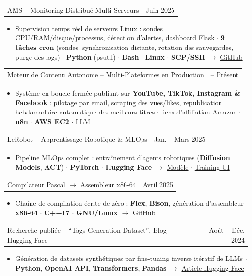 \documentclass[10pt, a4paper]{article}
\makeatletter
\newcommand{\headfont}{\sffamily}
\newlength{\mainInner}\setlength{\mainInner}{\textwidth}
\providecommand{\cvFit}{1.0}
\newlength{\cvgap}
\newcommand{\vgap}[1]{\setlength{\cvgap}{#1}\vspace{\cvFit\cvgap}}
\newcommand{\cvProject}[3]{%
  \begin{tabularx}{\mainInner}{@{}X r@{}}
    {\headfont\fontsize{10pt}{11.5pt}\selectfont #1} &
    {\headfont\color{mutedText}\fontsize{8.5pt}{10pt}\selectfont #2}
  \end{tabularx}\par\vspace{1pt}%
  #3\vgap{5pt}%
}
\newcommand{\cvBullets}[1]{%
  \vspace{2pt}%
  \begin{itemize}[leftmargin=10pt,itemsep=1pt,topsep=0pt,partopsep=0pt,parsep=0pt,
    label={\color{gold}\small$\bullet$}]
    #1
  \end{itemize}%
}
\newcommand{\cvItem}[1]{\item{\fontsize{8.8pt}{10.8pt}\selectfont #1}}
\makeatother
\begin{document}
\begin{lrbox}{\cvMainBox}
\begin{minipage}[t]{\mainInner}
  \cvProject{AMS -- Monitoring Distribu\'e Multi-Serveurs}
    {Juin 2025}{%
    \cvBullets{
      \cvItem{Supervision temps r\'eel de serveurs Linux : sondes CPU/RAM/disque/processus, d\'etection d'alertes, dashboard Flask $\cdot$ \textbf{9 t\^aches cron} (sondes, synchronisation distante, rotation des sauvegardes, purge des logs) $\cdot$ \textbf{Python} (psutil) $\cdot$ \textbf{Bash} $\cdot$ \textbf{Linux} $\cdot$ \textbf{SCP/SSH} $\to$ \href{https://github.com/ZinebMEFTAH/Servers-Monitoring-System}{GitHub}}
    }
  }

  \cvProject{Moteur de Contenu Autonome -- Multi-Plateformes en Production}
    {2026 -- Présent}{%
    \cvBullets{
      \cvItem{Système en boucle fermée publiant sur \textbf{YouTube, TikTok, Instagram \& Facebook} : pilotage par email, scraping des vues/likes, republication hebdomadaire automatique des meilleurs titres $\cdot$ liens d'affiliation Amazon $\cdot$ \textbf{n8n} $\cdot$ \textbf{AWS EC2} $\cdot$ LLM}
    }
  }

  \cvProject{LeRobot -- Apprentissage Robotique \& MLOps}
    {Jan. -- Mars 2025}{%
    \cvBullets{
      \cvItem{Pipeline MLOps complet : entraînement d'agents robotiques (\textbf{Diffusion Models}, \textbf{ACT}) $\cdot$ \textbf{PyTorch} $\cdot$ \textbf{Hugging Face} $\to$ \href{https://huggingface.co/zino36/lerobot-pusht-colab}{Modèle} $\cdot$ \href{https://huggingface.co/spaces/zino36/lerobot-pusht-trainer}{Training UI}}
    }
  }

  \cvProject{Compilateur Pascal $\to$ Assembleur x86-64}
    {Avril 2025}{%
    \cvBullets{
      \cvItem{Cha\^ine de compilation \'ecrite de z\'ero : \textbf{Flex}, \textbf{Bison}, g\'en\'eration d'assembleur \textbf{x86-64} $\cdot$ \textbf{C++17} $\cdot$ \textbf{GNU/Linux} $\to$ \href{https://github.com/ZinebMEFTAH/MonCompilateur}{GitHub}}
    }
  }


  \cvProject{Recherche publiée -- ``Tags Generation Dataset'', Blog Hugging Face}
    {Août -- Déc. 2024}{%
    \cvBullets{
      \cvItem{Génération de datasets synthétiques par fine-tuning inverse itératif de LLMs $\cdot$ \textbf{Python}, \textbf{OpenAI API}, \textbf{Transformers}, \textbf{Pandas} $\to$ \href{https://huggingface.co/blog/zino36/tags-generation-dataset-article}{Article Hugging Face}}
    }
  }


\end{minipage}
\end{lrbox}
\end{document}
